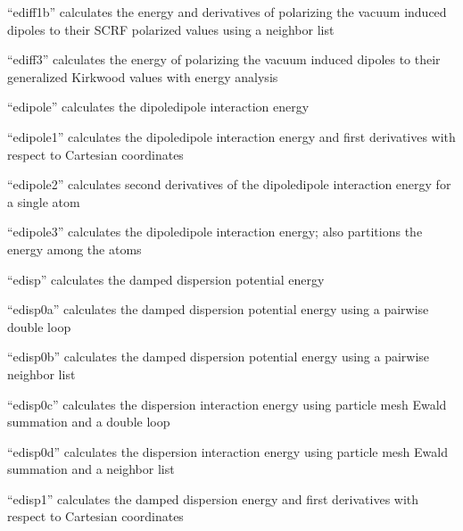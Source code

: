 \documentclass[letterpaper,11pt,english]{sphinxmanual}
\begin{document}
“ediff1b” calculates the energy and derivatives of polarizing
the vacuum induced dipoles to their SCRF polarized values using
a neighbor list


“ediff3” calculates the energy of polarizing the vacuum induced
dipoles to their generalized Kirkwood values with energy analysis


“edipole” calculates the dipole\sphinxhyphen{}dipole interaction energy


“edipole1” calculates the dipole\sphinxhyphen{}dipole interaction energy
and first derivatives with respect to Cartesian coordinates


“edipole2” calculates second derivatives of the
dipole\sphinxhyphen{}dipole interaction energy for a single atom


“edipole3” calculates the dipole\sphinxhyphen{}dipole interaction energy;
also partitions the energy among the atoms


“edisp” calculates the damped dispersion potential energy


“edisp0a” calculates the damped dispersion potential energy
using a pairwise double loop


“edisp0b” calculates the damped dispersion potential energy
using a pairwise neighbor list


“edisp0c” calculates the dispersion interaction energy using
particle mesh Ewald summation and a double loop


“edisp0d” calculates the dispersion interaction energy using
particle mesh Ewald summation and a neighbor list


“edisp1” calculates the damped dispersion energy and first
derivatives with respect to Cartesian coordinates
\end{document}
